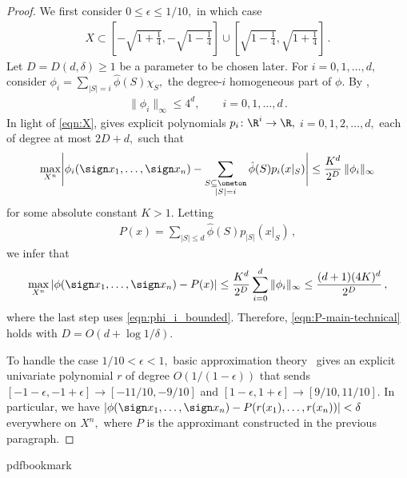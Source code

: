 \begin{proof}
We first consider $0\leq\epsilon\leq1/10,$ in which
case 
\begin{align}
X\subset\left[-\sqrt{1+\frac14},-\sqrt{1-\frac14}\right]\cup
\left[\sqrt{1-\frac14},\sqrt{1+\frac14}\right]\,.
\label{eqn:X}
\end{align}
Let $D=D(d,\delta)\geq1$ be a parameter to be chosen later.
For $i=0,1,\dots,d,$ consider 
$\phi_i=\sum_{|S|=i}\hat\phi(S)\chi_S,$ the
degree-$i$ homogeneous part of $\phi$.
By ,
\begin{align}
\label{eqn:phi_i_bounded}
\|\phi_i\|_\infty \leq 4^d, \qquad
i=0,1,\dots,d\,.
\end{align}
In light of \eqref{eqn:X},  gives explicit
polynomials $p_i\colon\R^i\to\R,$
$i=0,1,2,\dots,d,$ each of degree at most $2D+d,$ such
that
\begin{align*}
\max_{X^n}\Biggl|\phi_i(\sign x_1,\dots,\sign x_n)
 - \sum_{\substack{S\subseteq\oneton\\|S|=i}}\hat\phi(S)p_i(x|_S)
 \Biggr| \leq
\frac{K^d}{2^D} \, \|\phi_i\|_\infty
\end{align*}
for some absolute constant $K>1$. 
Letting 
\begin{align*}
P(x) = \sum_{|S|\leq d}\hat\phi(S)p_{|S|}(x|_S)\,, 
\end{align*}
we infer that 
\begin{align*}
\max_{X^n}\left|\phi(\sign x_1,\dots,\sign x_n)
 - P(x)\right|
\leq
\frac{K^d}{2^D} \sum_{i=0}^d\|\phi_i\|_\infty
\leq 
\frac{(d+1)(4K)^d}{2^D}\,,
\end{align*}
where the last step uses \eqref{eqn:phi_i_bounded}.
Therefore, \eqref{eqn:P-main-technical} holds with 
$D=O(d+\log 1/\delta)$. 

To handle the case $1/10<\epsilon<1,$ basic approximation
theory~\cite{rivlin-book} gives an explicit univariate
polynomial $r$ of degree $O(1/{(1-\epsilon)})$ that sends
$[-1-\epsilon,-1+\epsilon]\to[-11/10,-9/10]$ and 
$[1-\epsilon,1+\epsilon]\to[9/10,11/10]$. In particular, we have
$\left|\phi(\sign x_1,\dots,\sign
x_n)-P(r(x_1),\dots,r(x_n))\right|<\delta$ everywhere
on $X^n,$ where $P$ is the approximant constructed in the
previous paragraph.
\end{proof}

%
%
%
%
%
\providecommand{\bibhead}[1]{}
%
\expandafter\ifx\csname pdfbookmark\endcsname\relax%
  \providecommand{\tocrefpdfbookmark}{}
\else\providecommand{\tocrefpdfbookmark}{%
   \hypertarget{tocreferences}{}%
   \pdfbookmark[1]{References}{tocreferences}}%
\fi

